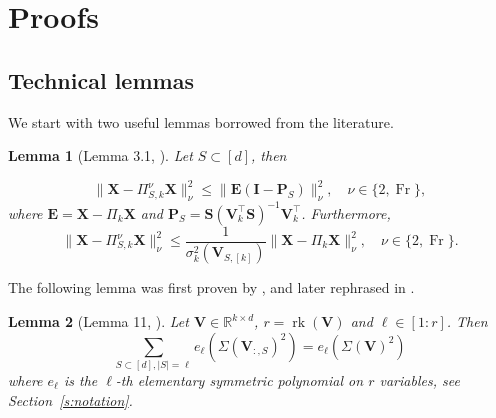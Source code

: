\documentclass[twoside,11pt]{book}
\newtheorem{lemma}{Lemma}
\numberwithin{theorem}{chapter}
\numberwithin{definition}{chapter}
\numberwithin{proposition}{chapter}
\numberwithin{corollary}{chapter}
\numberwithin{example}{chapter}
\numberwithin{lemma}{chapter}
\numberwithin{assumption}{chapter}
\DeclareMathOperator{\Tr}{Tr}
\DeclareMathOperator{\rank}{\mathrm{rk}}
\DeclareMathOperator{\Fr}{\mathrm{Fr}}
\DeclareMathOperator{\Tran}{\intercal}
\begin{document}
\section{Proofs}
\label{app:proofs}


\subsection{Technical lemmas}
We start with two useful lemmas borrowed from the literature.
\begin{lemma}[Lemma 3.1, \citealp{BoDrMI11}]\label{refined_analysis_of_approximation_bound}
Let $S \subset [d]$, then

\begin{equation}
\| \bm{X} - \Pi_{S,k}^{\nu} \bm{X} \|_{\nu}^{2}  \leq  \| \bm{E}(\bm{I}-\bm{P}_{S})\|_{\nu}^{2}, \quad \nu \in \{2,\Fr\},
\end{equation}
where   $\bm{E} = \bm{X} - \Pi_{k}\bm{X}$ and $\bm{P}_{S} = \bm{S}(\bm{V}_{k}^{\Tran}\bm{S})^{-1}\bm{V}_{k}^{\Tran}$.
Furthermore,
\begin{equation}
\| \bm{X} - \Pi_{S,k}^{\nu} \bm{X} \|_{\nu}^{2} \leq  \frac{1}{\sigma_{k}^{2}(\bm{V}_{S,[k]})} \| \bm{X} - \Pi_{k}\bm{X}\|_{\nu}^{2} , \quad \nu \in \{2,\Fr\}.
\end{equation}
\end{lemma}
The following lemma was first proven by \citealp{DRVW06}, and later rephrased in \cite{DeRa10}.
\begin{lemma}[Lemma 11, \citealp{DeRa10}]\label{minors_symmetric_polynomials_lemma}
Let $\bm{V} \in \mathbb{R}^{k \times d}$, $r = \rank(\bm{V})$ and $\ell \in [1:r]$. Then
\begin{equation}
\sum\limits_{S \subset [d], |S| = \ell} e_{\ell}(\Sigma(\bm{V}_{:,S})^{2}) = e_{\ell}(\Sigma(\bm{V})^{2})
\end{equation}
where $e_{\ell}$ is the $\ell$-th elementary symmetric polynomial on $r$ variables, see Section~\ref{s:notation}.
\end{lemma}
\end{document}

